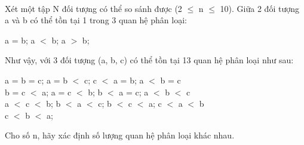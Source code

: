  

Xét một tập N đối tượng có thể so sánh được (2 $\le$ n $\le$ 10). Giữa 2 đối tượng a và b có thể tồn tại 1 trong 3 quan hệ phân loại:

a = b; a $<$ b; a $>$ b;

Như vậy, với 3 đối tượng (a, b, c) có thể tồn tại 13 quan hệ phân loại như sau:

a = b = c; a = b $<$ c; c $<$ a = b; a $<$ b = c
\\b = c $<$ a; a = c $<$ b; b $<$ a = c; a $<$ b $<$ c
\\a $<$ c $<$ b; b $<$ a $<$ c; b $<$ c $<$ a; c $<$ a $<$ b
\\c $<$ b $<$ a;

Cho số n, hãy xác định số lượng quan hệ phân loại khác nhau.

\